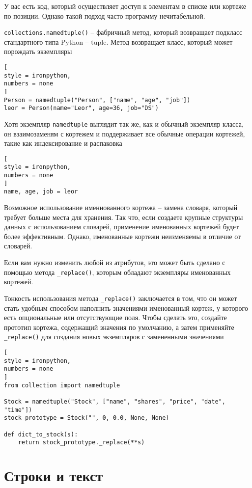 \documentclass[%
	11pt,
	a4paper,
	utf8,
		]{article}
\begin{document}
У вас есть код, который осуществляет доступ к элементам в списке или кортеже по позиции. Однако такой подход часто программу нечитабельной. 

\texttt{collections.namedtuple()} -- фабричный метод, который возвращает подкласс стандартного типа Python -- tuple. Метод возвращает класс, который может порождать экземпляры
\begin{lstlisting}[
style = ironpython,
numbers = none
]
Person = namedtuple("Person", ["name", "age", "job"])
leor = Person(name="Leor", age=36, job="DS")
\end{lstlisting}

Хотя экземпляр \texttt{namedtuple} выглядит так же, как и обычный экземпляр класса, он взаимозаменям с кортежем и поддерживает все обычные операции кортежей, такие как индексирование и распаковка
\begin{lstlisting}[
style = ironpython,
numbers = none	
]
name, age, job = leor
\end{lstlisting}

Возможное использование именнованного кортежа -- замена словаря, который требует больше места для хранения. Так что, если создаете крупные структуры данных с использованием словарей, применение именованных кортежей будет более эффективным. Однако, именованные кортежи неизменяемы в отличие от словарей.

Если вам нужно изменить любой из атрибутов, это может быть сделано с помощью метода \verb|_replace()|, которым обладают экземпляры именованных кортежей.

Тонкость использования метода \verb|_replace()| заключается в том, что он может стать удобным способом наполнить значениями именованный кортеж, у которого есть опциональные или отсутствующие поля. Чтобы сделать это, создайте прототип кортежа, содержащий значения по умолчанию, а затем применяйте \verb|_replace()| для создания новых экземпляров с замененными значениями
\begin{lstlisting}[
style = ironpython,
numbers = none
]
from collection import namedtuple

Stock = namedtuple("Stock", ["name", "shares", "price", "date", "time"])
stock_prototype = Stock("", 0, 0.0, None, None)

def dict_to_stock(s):
    return stock_prototype._replace(**s)
\end{lstlisting}

\section{Строки и текст}
\end{document}
